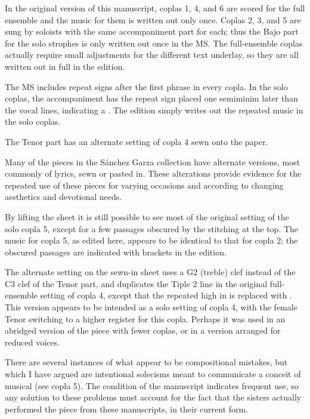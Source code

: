 
In the original version of this manuscript, coplas 1, 4, and 6 are scored for 
the full ensemble and the music for them is written out only once.
Coplas 2, 3, and 5 are sung by soloists with the same accompaniment part for 
each; thus the Bajo part for the solo strophes is only written out once in the 
MS.
The full-ensemble coplas actually require small adjustments for the different 
text underlay, so they are all written out in full in the edition.

The MS includes repeat signs after the first phrase in every copla. 
In the solo coplas, the accompaniment has the repeat sign placed one semiminim 
later than the vocal lines, indicating a .
The edition simply writes out the repeated music in the solo coplas.

The Tenor part has an alternate setting of copla 4 sewn onto the paper.%
  \begin{Footnote}
      Many of the pieces in the Sánchez Garza collection have alternate 
      versions, most commonly of lyrics, sewn or pasted in. 
      These alterations provide evidence for the repeated use of these pieces
      for varying occasions and according to changing aesthetics and devotional
      needs.
  \end{Footnote}
By lifting the sheet it is still possible to see most of the original setting 
of the solo copla 5, except for a few passages obscured by the stitching at the 
top.
The music for copla 5, as edited here, appears to be identical to that for 
copla 2; the obscured passages are indicated with brackets in the edition.

The alternate setting on the sewn-in sheet uses a G2 (treble) clef instead of
the C3 clef of the Tenor part, and duplicates the Tiple 2 line in the original
full-ensemble setting of copla 4, except that the repeated high  in 
 is replaced with .
This version appears to be intended as a solo setting of copla 4, with the 
female Tenor switching to a higher register for this copla. 
Perhaps it was used in an abridged version of the piece with fewer coplas, or 
in a version arranged for reduced voices.



There are several instances of what appear to be compositional mistakes, but
which I have argued are intentional solecisms meant to communicate a conceit of
musical  (see copla 5).%
    \Autocite[375--403]{Cashner:PhD}
The condition of the manuscript indicates frequent use, so any solution to 
these problems must account for the fact that the sisters actually performed 
the piece from these manuscripts, in their current form.

